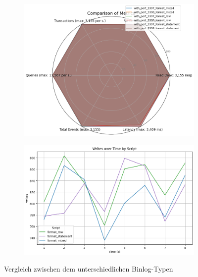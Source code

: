 \begin{figure}[H]
  \centering
  \begin{subfigure}[t]{0.48\textwidth}
    \centering
    \includegraphics[width=\textwidth]{PNGs/Script/Replication/replication-format-change/statistics}
    \label{replication-format-change-statistics}
  \end{subfigure}
  \hfill
  \begin{subfigure}[t]{0.48\textwidth}
    \centering
    \includegraphics[width=\textwidth]{PNGs/Script/Replication/replication-format-change/Writes}
    \label{replication-format-change-writes}
  \end{subfigure}
  \vspace{-20pt}
  \caption[Replikation: Metrikvergleich]{Vergleich zwischen dem unterschiedlichen Binlog-Typen }
  \label{fig:replication-format-change}
\end{figure}
\vspace{-20pt}

